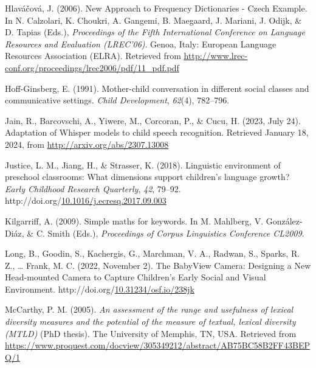\documentclass[10pt, letterpaper]{article}
\newlength{\cslhangindent}
\newlength{\cslentryspacingunit} %
\newenvironment{CSLReferences}[2] %
{%
	\setlength{\parindent}{0pt}
	\ifodd #1
	\let\oldpar\par
	\def\par{\hangindent=\cslhangindent\oldpar}
	\fi
}%
{}
\begin{document}
\begin{CSLReferences}{1}{0}
\leavevmode{}%
Hlaváčová, J. (2006). New {Approach} to {Frequency Dictionaries} -
{Czech Example}. In N. Calzolari, K. Choukri, A. Gangemi, B. Maegaard,
J. Mariani, J. Odijk, \& D. Tapias (Eds.), \emph{Proceedings of the
{Fifth International Conference} on {Language Resources} and
{Evaluation} ({LREC}'06)}. {Genoa, Italy}: {European Language Resources
Association (ELRA)}. Retrieved from
\url{http://www.lrec-conf.org/proceedings/lrec2006/pdf/11_pdf.pdf}

\leavevmode{}%
Hoff-Ginsberg, E. (1991). Mother-child conversation in different social
classes and communicative settings. \emph{Child Development},
\emph{62}(4), 782--796.

\leavevmode{}%
Jain, R., Barcovschi, A., Yiwere, M., Corcoran, P., \& Cucu, H. (2023,
July 24). Adaptation of {Whisper} models to child speech recognition.
Retrieved January 18, 2024, from \url{http://arxiv.org/abs/2307.13008}

\leavevmode{}%
Justice, L. M., Jiang, H., \& Strasser, K. (2018). Linguistic
environment of preschool classrooms: {What} dimensions support
children's language growth? \emph{Early Childhood Research Quarterly},
\emph{42}, 79--92.
http://doi.org/\href{https://doi.org/10.1016/j.ecresq.2017.09.003}{10.1016/j.ecresq.2017.09.003}

\leavevmode{}%
Kilgarriff, A. (2009). Simple maths for keywords. In M. Mahlberg, V.
González-Diáz, \& C. Smith (Eds.), \emph{Proceedings of {Corpus
Linguistics Conference CL2009}}.

\leavevmode{}%
Long, B., Goodin, S., Kachergis, G., Marchman, V. A., Radwan, S.,
Sparks, R. Z., \ldots{} Frank, M. C. (2022, November 2). The {BabyView
Camera}: {Designing} a {New Head-mounted Camera} to {Capture Children}'s
{Early Social} and {Visual Environment}.
http://doi.org/\href{https://doi.org/10.31234/osf.io/238jk}{10.31234/osf.io/238jk}

\leavevmode{}%
McCarthy, P. M. (2005). \emph{An assessment of the range and usefulness
of lexical diversity measures and the potential of the measure of
textual, lexical diversity ({MTLD})} (PhD thesis). {The University of
Memphis}, {TN, USA}. Retrieved from
\url{https://www.proquest.com/docview/305349212/abstract/AB75BC58B2FF43BEPQ/1}


\end{CSLReferences}
\end{document}
